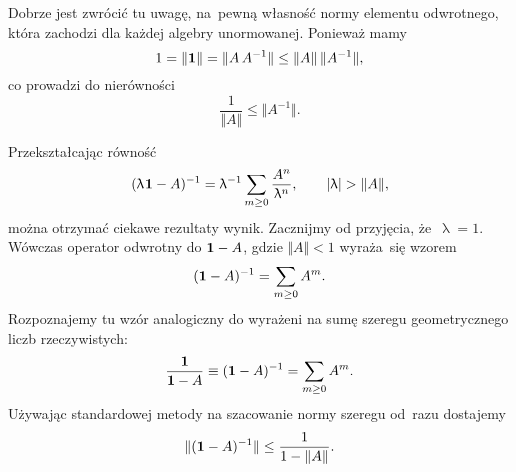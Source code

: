 \documentclass[a4paper,11pt]{article}
\numberwithin{equation}{section}
\renewcommand{\lambda}{\uplambda}
\begin{document}
\VerSpaceFour





\noindent
{} Dobrze jest zwrócić tu uwagę, na~pewną własność normy elementu
odwrotnego, która zachodzi dla każdej algebry unormowanej. Ponieważ mamy
\begin{equation}
  \label{eq:Bratteli-Robinson-Operator-Algebras-ETC-Vol-I-s01-27}
  1 = \Vert \mathbf{1} \Vert = \Vert A \, A^{ -1 } \Vert \leq \Vert A \Vert \, \Vert A^{ -1 } \Vert,
\end{equation}
co prowadzi do nierówności
\begin{equation}
  \label{eq:Bratteli-Robinson-Operator-Algebras-ETC-Vol-I-s01-28}
  \frac{ 1 }{ \Vert A \Vert } \leq \Vert A^{ -1 } \Vert.
\end{equation}

\VerSpaceFour





\noindent
{} Przekształcając równość
\begin{equation}
  \label{eq:Bratteli-Robinson-Operator-Algebras-ETC-Vol-I-s01-29}
  ( \lambda \HorSpaceOne \UnitAlg - A )^{ -1 } =
  \lambda^{ -1 } \sum_{ m \geq 0 } \frac{ A^{ n } }{ \lambda^{ n } }, \qquad
  | \lambda | > \Vert A \Vert,
\end{equation}
można otrzymać ciekawe rezultaty wynik. Zacznijmy od przyjęcia,
że~$\lambda = 1$. Wówczas operator odwrotny do $\mathbf{1} - A$, gdzie $\Vert A \Vert < 1$
wyraża~się wzorem
\begin{equation}
  \label{eq:Bratteli-Robinson-Operator-Algebras-ETC-Vol-I-s01-30}
  ( \mathbf{1} - A )^{ -1 } = \sum_{ m \geq 0 } A^{ m }.
\end{equation}
Rozpoznajemy tu wzór analogiczny do wyrażeni na sumę szeregu geometrycznego
liczb rzeczywistych:
\begin{equation}
  \label{eq:Bratteli-Robinson-Operator-Algebras-ETC-Vol-I-s01-31}
  \frac{ \mathbf{1} }{ \mathbf{1} - A } \equiv ( \mathbf{1} - A )^{ -1 } =
  \sum_{ m \geq 0 } A^{ m }.
\end{equation}
Używając standardowej metody na szacowanie normy szeregu od~razu dostajemy
\begin{equation}
  \label{eq:Bratteli-Robinson-Operator-Algebras-ETC-Vol-I-s01-32}
  \Vert ( \mathbf{1} - A )^{ -1 } \Vert \leq
  \frac{ 1 }{ 1 - \Vert A \Vert }.
\end{equation}
\end{document}
